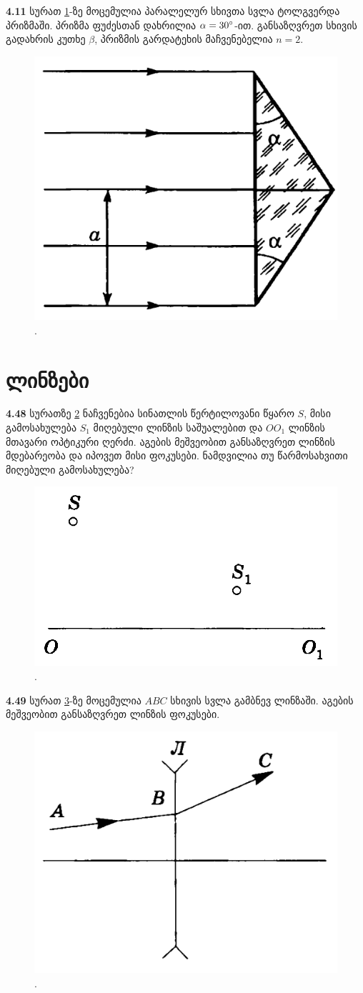 \documentclass[a4paper]{book}
\begin{document}
\textbf{4.11} სურათ \ref{fig:4_11}-ზე მოცემულია პარალელურ სხივთა სვლა ტოლგვერდა პრიზმაში. პრიზმა ფუძესთან დახრილია $\alpha = 30 \degree$-ით. განსაზღვრეთ სხივის გადახრის კუთხე $\beta$, პრიზმის გარდატეხის მაჩვენებელია $n = 2$.
	\begin{figure}[h]
		   \centering
           \includegraphics[width=0.4\columnwidth]{figures/4_11}
           \caption{.}
           \label{fig:4_11}
        \end{figure}

\section{ლინზები}

\textbf{4.48} სურათზე \ref{fig:4_48} ნაჩვენებია სინათლის წერტილოვანი წყარო $S$, მისი გამოსახულება $S_1$ მიღებული ლინზის საშუალებით და $OO_1$ ლინზის მთავარი ოპტიკური ღერძი. აგების მეშვეობით განსაზღვრეთ ლინზის მდებარეობა და იპოვეთ მისი ფოკუსები. ნამდვილია თუ წარმოსახვითი მიღებული გამოსახულება?
	\begin{figure}[h]
		   \centering
           \includegraphics[width=0.4\columnwidth]{figures/4_48}
           \caption{.}
           \label{fig:4_48}
        \end{figure}

\textbf{4.49} სურათ \ref{fig:4_49}-ზე მოცემულია $ABC$ სხივის სვლა გამბნევ ლინზაში. აგების მეშვეობით განსაზღვრეთ ლინზის ფოკუსები. 
	\begin{figure}[h]
		   \centering
           \includegraphics[width=0.4\columnwidth]{figures/4_49}
           \caption{.}
           \label{fig:4_49}
        \end{figure}
\end{document}
